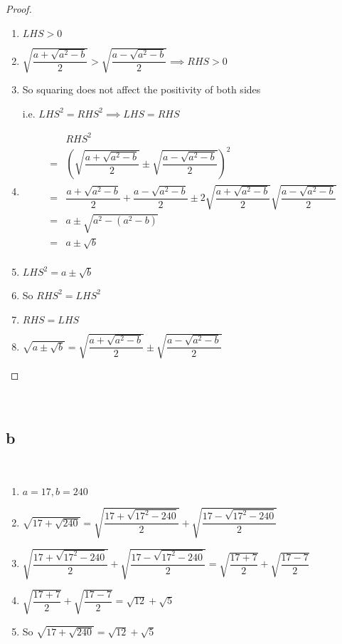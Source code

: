 \documentclass{article}
\begin{document}
\begin{proof}
    ~
    \begin{enumerate}
        \item $LHS>0$
        \item $\sqrt{\dfrac{a+\sqrt{a^2-b}}{2}}>\sqrt{\dfrac{a-\sqrt{a^2-b}}{2}}\implies RHS>0$
        \item So squaring does not affect the positivity of both sides
        
        i.e. $LHS^2=RHS^2\implies LHS=RHS$
        \item \begin{align*}
            &RHS^2\\
            =&\left(\sqrt{\dfrac{a+\sqrt{a^2-b}}{2}}\pm\sqrt{\dfrac{a-\sqrt{a^2-b}}{2}}\right)^2\\
            =&\dfrac{a+\sqrt{a^2-b}}{2}+\dfrac{a-\sqrt{a^2-b}}{2}\pm 2\sqrt{\dfrac{a+\sqrt{a^2-b}}{2}}\sqrt{\dfrac{a-\sqrt{a^2-b}}{2}}\\
            =&a\pm\sqrt{a^2-(a^2-b)}\\
            =&a\pm \sqrt{b}\\
        \end{align*}
        \item $LHS^2=a\pm\sqrt{b}$
        \item So $RHS^2=LHS^2$
        \item $RHS=LHS$
        \item $\sqrt{a\pm \sqrt{b}}=\sqrt{\dfrac{a+\sqrt{a^2-b}}{2}}\pm\sqrt{\dfrac{a-\sqrt{a^2-b}}{2}}$
    \end{enumerate}
\end{proof}

~

\subsection*{b}

~

\begin{enumerate}
    \item $a=17,b=240$
    \item $\sqrt{17+ \sqrt{240}}=\sqrt{\dfrac{17+\sqrt{17^2-240}}{2}}+\sqrt{\dfrac{17-\sqrt{17^2-240}}{2}}$
    \item $\sqrt{\dfrac{17+\sqrt{17^2-240}}{2}}+\sqrt{\dfrac{17-\sqrt{17^2-240}}{2}}=\sqrt{\dfrac{17+7}{2}}+\sqrt{\dfrac{17-7}{2}}$
    \item $\sqrt{\dfrac{17+7}{2}}+\sqrt{\dfrac{17-7}{2}}=\sqrt{12}+\sqrt{5}$
    \item So $\sqrt{17+ \sqrt{240}}=\sqrt{12}+\sqrt{5}$ 
\end{enumerate}
\end{document}
